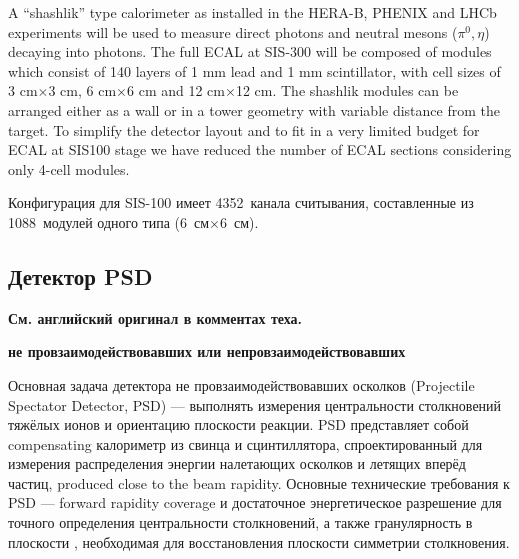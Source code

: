 A ``shashlik'' type calorimeter as installed in the HERA-B, PHENIX and LHCb experiments will
be used to measure direct photons and neutral mesons ($ \pi^{0}, \eta $) decaying into photons. The full
ECAL at SIS-300 will be composed of modules which consist of 140 layers of 1 mm lead and
1 mm scintillator, with cell sizes of 3 cm$\times$3 cm, 6 cm$\times$6 cm and 12 cm$\times$12 cm. The shashlik
modules can be arranged either as a wall or in a tower geometry with variable distance from the
target.
To simplify the detector layout and to fit in a very limited budget for ECAL at SIS100 stage we
have reduced the number of ECAL sections considering only 4-cell modules.

Конфигурация для SIS-100 имеет 4352~канала считывания, составленные из 1088~модулей одного типа (6~см$\times$6~см). 



\subsection{Детектор PSD}\label{sec:secPSD}

\textbf{См. английский оригинал в комментах теха.}

\todo \textbf{не провзаимодействовавших или непровзаимодействовавших} \todo

Основная задача детектора не провзаимодействовавших осколков (Projectile Spectator Detector, PSD) --- выполнять измерения центральности столкновений тяжёлых ионов и ориентацию плоскости реакции. PSD представляет собой compensating \todo калориметр из свинца и сцинтиллятора, спроектированный для измерения распределения энергии налетающих осколков и летящих вперёд частиц, produced close to the beam rapidity.
Основные технические требования к PSD --- forward rapidity coverage и достаточное энергетическое разрешение для точного определения центральности столкновений, а также гранулярность в плоскости \todo, необходимая для восстановления плоскости симметрии столкновения.


